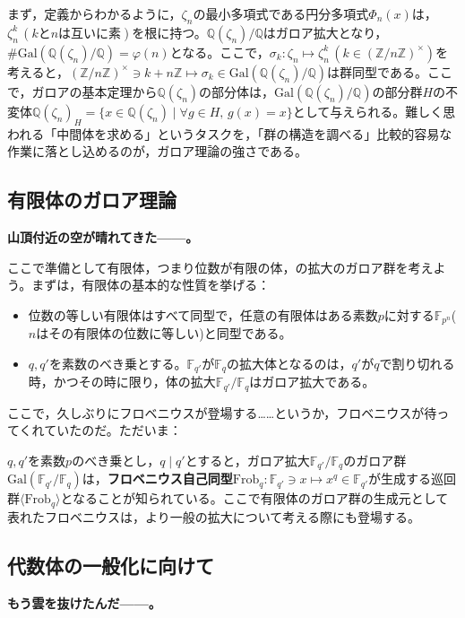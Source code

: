 まず，定義からわかるように，$\zeta_n$の最小多項式である円分多項式$\Phi_n(x)$は，$\zeta_n^k\,(k\text{と}n\text{は互いに素})$を根に持つ。$\mathbb{Q}(\zeta_n)/{\mathbb{Q}}$はガロア拡大となり，$\#\mathrm{Gal}(\mathbb{Q}(\zeta_n)/{\mathbb{Q}})=\varphi(n)$となる。ここで，$\sigma_k:\zeta_n\mapsto\zeta_n^k\, (k\in (\mathbb{Z}/{n\mathbb{Z}})^{\times})$を考えると，$(\mathbb{Z}/{n\mathbb{Z}})^{\times}\ni k+n\mathbb{Z}\mapsto\sigma_k\in\mathrm{Gal}(\mathbb{Q}(\zeta_n)/{\mathbb{Q}})$は群同型である。ここで，ガロアの基本定理から$\mathbb{Q}(\zeta_n)$の部分体は，$\mathrm{Gal}(\mathbb{Q}(\zeta_n)/{\mathbb{Q}})$の部分群$H$の不変体$\mathbb{Q}(\zeta_n)_H=\{x\in\mathbb{Q}(\zeta_n)\mid\forall g\in H,\, g(x)=x\}$として与えられる。難しく思われる「中間体を求める」というタスクを，「群の構造を調べる」比較的容易な作業に落とし込めるのが，ガロア理論の強さである。

\subsection{有限体のガロア理論}
\textbf{山頂付近の空が晴れてきた------。}

\vspace{10pt}

ここで準備として有限体，つまり位数が有限の体，の拡大のガロア群を考えよう。まずは，有限体の基本的な性質を挙げる：
\begin{itemize}
    \item 位数の等しい有限体はすべて同型で，任意の有限体はある素数$p$に対する$\mathbb{F}_{p^n}$($n$はその有限体の位数に等しい)と同型である。
    \item $q,q'$を素数のべき乗とする。$\mathbb{F}_{q'}$が$\mathbb{F}_{q}$の拡大体となるのは，$q'$が$q$で割り切れる時，かつその時に限り，体の拡大$\mathbb{F}_{q'}/{\mathbb{F}_q}$はガロア拡大である。
\end{itemize}
ここで，久しぶりにフロベニウスが登場する\dots\dots というか，フロベニウスが待ってくれていたのだ。ただいま：

$q,q'$を素数$p$のべき乗とし，$q\mid q'$とすると，ガロア拡大$\mathbb{F}_{q'}/{\mathbb{F}_q}$のガロア群$\mathrm{Gal}(\mathbb{F}_{q'}/{\mathbb{F}_q})$は，\textbf{フロベニウス自己同型}$\mathrm{Frob}_q:\mathbb{F}_{q'}\ni x\mapsto x^q\in\mathbb{F}_{q'}$が生成する巡回群$\langle\mathrm{Frob}_q\rangle$となることが知られている。ここで有限体のガロア群の生成元として表れたフロベニウスは，より一般の拡大について考える際にも登場する。

\subsection{代数体の一般化に向けて}\label{ippanka}
\textbf{もう雲を抜けたんだ------。}

